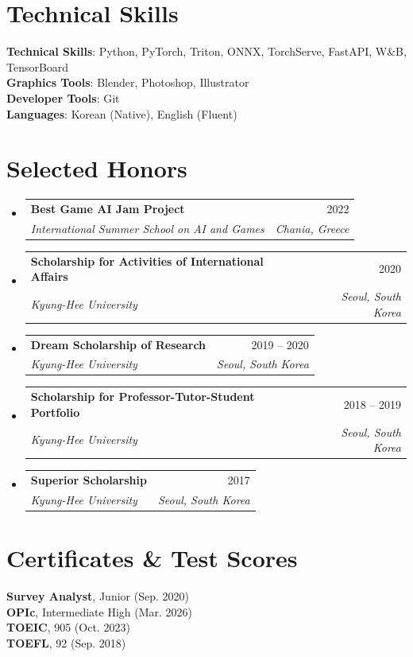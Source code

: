 \documentclass[letterpaper,11pt]{article}
\makeatletter
\newcommand{\resumeSubheading}[4]{
  \vspace{-2pt}\item
    \begin{tabular*}{0.97\textwidth}[t]{l@{\extracolsep{\fill}}r}
      \textbf{#1} & #2 \\
      \textit{\small#3} & \textit{\small #4} \\
    \end{tabular*}\vspace{-7pt}
}
\newcommand{\resumeSubHeadingListStart}{\begin{itemize}[leftmargin=0.15in, label={}]}
\newcommand{\resumeSubHeadingListEnd}{\end{itemize}}
\makeatother
\begin{document}
%
\section{Technical Skills}
 \begin{itemize}[leftmargin=0.15in, label={}]
    \small{\item{
     \textbf{Technical Skills}{: Python, PyTorch, Triton, ONNX, TorchServe, FastAPI, W\&B, TensorBoard} \\
     \textbf{Graphics Tools}{: Blender, Photoshop, Illustrator} \\
     \textbf{Developer Tools}{: Git} \\
     \textbf{Languages}{: Korean (Native), English (Fluent)}
    }}
 \end{itemize}



\section{Selected Honors}
  \resumeSubHeadingListStart
    \resumeSubheading
      {Best Game AI Jam Project}{2022}
      {International Summer School on AI and Games}{Chania, Greece}
    \resumeSubheading{Scholarship for Activities of International Affairs}{2020}{Kyung-Hee University}{Seoul, South Korea}
    \resumeSubheading{Dream Scholarship of Research}{2019 -- 2020}{Kyung-Hee University}{Seoul, South Korea}
    \resumeSubheading{Scholarship for Professor-Tutor-Student Portfolio}{2018 -- 2019}{Kyung-Hee University}{Seoul, South Korea}
    \resumeSubheading
    {Superior Scholarship}{2017}{Kyung-Hee University}{Seoul, South Korea}
    \resumeSubHeadingListEnd

\section{Certificates \& Test Scores}
 \begin{itemize}[leftmargin=0.15in, label={}]
    \small{\item{
    \textbf{Survey Analyst}{, Junior (Sep. 2020)} \\
     \textbf{OPIc}{, Intermediate High (Mar. 2026)} \\
     \textbf{TOEIC}{, 905 (Oct. 2023)} \\
     \textbf{TOEFL}{, 92 (Sep. 2018)} \\
    }}
 \end{itemize}
\end{document}
